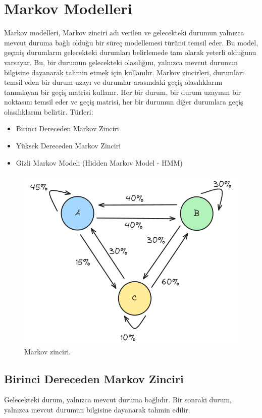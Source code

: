\section{Markov Modelleri}
Markov modelleri, Markov zinciri adı verilen ve gelecekteki durumun yalnızca mevcut duruma bağlı olduğu bir süreç modellemesi türünü temsil eder. Bu model, geçmiş durumların gelecekteki durumları belirlemede tam olarak yeterli olduğunu varsayar. Bu, bir durumun gelecekteki olasılığını, yalnızca mevcut durumun bilgisine dayanarak tahmin etmek için kullanılır. Markov zincirleri, durumları temsil eden bir durum uzayı ve durumlar arasındaki geçiş olasılıklarını tanımlayan bir geçiş matrisi kullanır. Her bir durum, bir durum uzayının bir noktasını temsil eder ve geçiş matrisi, her bir durumun diğer durumlara geçiş olasılıklarını belirtir. Türleri:
\begin{itemize}
    \item Birinci Dereceden Markov Zinciri
    \item Yüksek Dereceden Markov Zinciri
    \item Gizli Markov Modeli (Hidden Markov Model - HMM)
\end{itemize}

\begin{figure}[h]
    \centering
    \includegraphics[width=1\textwidth]{images/markov_chains.png}
    \caption{Markov zinciri.}
    \label{fig:enter-label}
\end{figure}

\newpage

\subsection{Birinci Dereceden Markov Zinciri}
Gelecekteki durum, yalnızca mevcut duruma bağlıdır. Bir sonraki durum, yalnızca mevcut durumun bilgisine dayanarak tahmin edilir.

